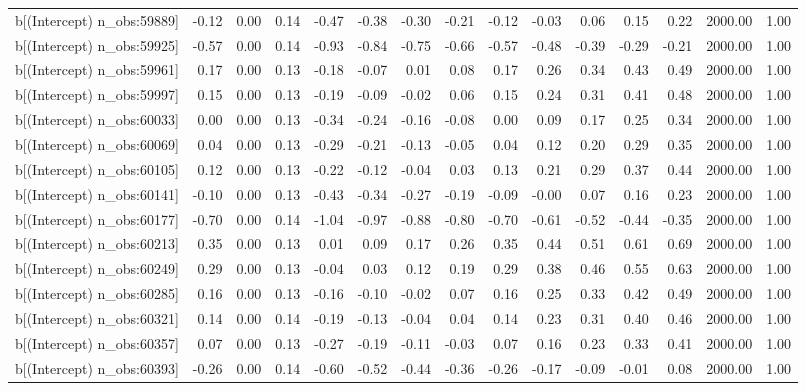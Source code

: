 \begin{table}[ht]
\begin{tabular}{rrrrrrrrrrrrrrr}
  b[(Intercept) n\_obs:59889] & -0.12 & 0.00 & 0.14 & -0.47 & -0.38 & -0.30 & -0.21 & -0.12 & -0.03 & 0.06 & 0.15 & 0.22 & 2000.00 & 1.00 \\ 
  b[(Intercept) n\_obs:59925] & -0.57 & 0.00 & 0.14 & -0.93 & -0.84 & -0.75 & -0.66 & -0.57 & -0.48 & -0.39 & -0.29 & -0.21 & 2000.00 & 1.00 \\ 
  b[(Intercept) n\_obs:59961] & 0.17 & 0.00 & 0.13 & -0.18 & -0.07 & 0.01 & 0.08 & 0.17 & 0.26 & 0.34 & 0.43 & 0.49 & 2000.00 & 1.00 \\ 
  b[(Intercept) n\_obs:59997] & 0.15 & 0.00 & 0.13 & -0.19 & -0.09 & -0.02 & 0.06 & 0.15 & 0.24 & 0.31 & 0.41 & 0.48 & 2000.00 & 1.00 \\ 
  b[(Intercept) n\_obs:60033] & 0.00 & 0.00 & 0.13 & -0.34 & -0.24 & -0.16 & -0.08 & 0.00 & 0.09 & 0.17 & 0.25 & 0.34 & 2000.00 & 1.00 \\ 
  b[(Intercept) n\_obs:60069] & 0.04 & 0.00 & 0.13 & -0.29 & -0.21 & -0.13 & -0.05 & 0.04 & 0.12 & 0.20 & 0.29 & 0.35 & 2000.00 & 1.00 \\ 
  b[(Intercept) n\_obs:60105] & 0.12 & 0.00 & 0.13 & -0.22 & -0.12 & -0.04 & 0.03 & 0.13 & 0.21 & 0.29 & 0.37 & 0.44 & 2000.00 & 1.00 \\ 
  b[(Intercept) n\_obs:60141] & -0.10 & 0.00 & 0.13 & -0.43 & -0.34 & -0.27 & -0.19 & -0.09 & -0.00 & 0.07 & 0.16 & 0.23 & 2000.00 & 1.00 \\ 
  b[(Intercept) n\_obs:60177] & -0.70 & 0.00 & 0.14 & -1.04 & -0.97 & -0.88 & -0.80 & -0.70 & -0.61 & -0.52 & -0.44 & -0.35 & 2000.00 & 1.00 \\ 
  b[(Intercept) n\_obs:60213] & 0.35 & 0.00 & 0.13 & 0.01 & 0.09 & 0.17 & 0.26 & 0.35 & 0.44 & 0.51 & 0.61 & 0.69 & 2000.00 & 1.00 \\ 
  b[(Intercept) n\_obs:60249] & 0.29 & 0.00 & 0.13 & -0.04 & 0.03 & 0.12 & 0.19 & 0.29 & 0.38 & 0.46 & 0.55 & 0.63 & 2000.00 & 1.00 \\ 
  b[(Intercept) n\_obs:60285] & 0.16 & 0.00 & 0.13 & -0.16 & -0.10 & -0.02 & 0.07 & 0.16 & 0.25 & 0.33 & 0.42 & 0.49 & 2000.00 & 1.00 \\ 
  b[(Intercept) n\_obs:60321] & 0.14 & 0.00 & 0.14 & -0.19 & -0.13 & -0.04 & 0.04 & 0.14 & 0.23 & 0.31 & 0.40 & 0.46 & 2000.00 & 1.00 \\ 
  b[(Intercept) n\_obs:60357] & 0.07 & 0.00 & 0.13 & -0.27 & -0.19 & -0.11 & -0.03 & 0.07 & 0.16 & 0.23 & 0.33 & 0.41 & 2000.00 & 1.00 \\ 
  b[(Intercept) n\_obs:60393] & -0.26 & 0.00 & 0.14 & -0.60 & -0.52 & -0.44 & -0.36 & -0.26 & -0.17 & -0.09 & -0.01 & 0.08 & 2000.00 & 1.00 \\ 

\end{tabular}
\end{table}
